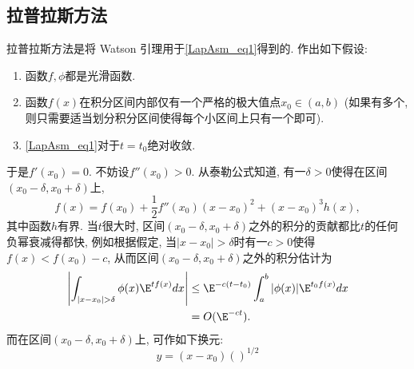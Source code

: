 \subsection{拉普拉斯方法}
拉普拉斯方法是将 Watson 引理用于\autoref{LapAsm_eq1}得到的. 作出如下假设:

\begin{enumerate}
\item 函数$f,\phi$都是光滑函数.

\item 函数$f(x)$在积分区间内部仅有一个严格的极大值点$x_0\in(a,b)$ (如果有多个, 则只需要适当划分积分区间使得每个小区间上只有一个即可). 

\item \autoref{LapAsm_eq1}对于$t=t_0$绝对收敛.
\end{enumerate}

于是$f'(x_0)=0$. 不妨设$f''(x_0)>0$. 从泰勒公式知道, 有一$\delta>0$使得在区间$(x_0-\delta,x_0+\delta)$上, 
$$
f(x)=f(x_0)+\frac{1}{2}f''(x_0)(x-x_0)^2+(x-x_0)^3h(x),
$$
其中函数$h$有界. 当$t$很大时, 区间$(x_0-\delta,x_0+\delta)$之外的积分的贡献都比$t$的任何负幂衰减得都快, 例如根据假定, 当$|x-x_0|>\delta$时有一$c>0$使得$f(x)<f(x_0)-c$, 从而区间$(x_0-\delta,x_0+\delta)$之外的积分估计为
$$
\begin{aligned}
\left|\int_{|x-x_0|>\delta}\phi(x)\E^{tf(x)}dx\right|
&\leq \E^{-c(t-t_0)}\int_a^b|\phi(x)|\E^{t_0f(x)}dx\\
&=O(\E^{-ct}).
\end{aligned}
$$
而在区间$(x_0-\delta,x_0+\delta)$上, 可作如下换元:
$$
y=(x-x_0)\left(\right)^{1/2}
$$

